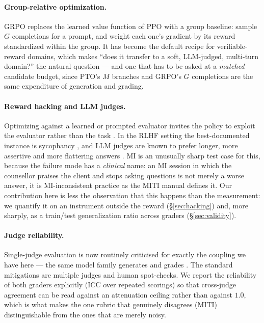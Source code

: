 \paragraph{Group-relative optimization.}
GRPO \citep{shao2024deepseekmath} replaces the learned value function of PPO
\citep{schulman2017ppo} with a group baseline: sample $G$ completions for a prompt, and
weight each one's gradient by its reward standardized within the group. It has become the
default recipe for verifiable-reward domains, which makes ``does it transfer to a soft,
LLM-judged, multi-turn domain?'' the natural question --- and one that has to be asked at a
\emph{matched} candidate budget, since PTO's $M$ branches and GRPO's $G$ completions are
the same expenditure of generation and grading.

\paragraph{Reward hacking and LLM judges.}
Optimizing against a learned or prompted evaluator invites the policy to exploit the
evaluator rather than the task \citep{gao2023scaling, skalse2022defining}. In the RLHF
setting the best-documented instance is sycophancy \citep{sharma2024sycophancy,
perez2023discovering}, and LLM judges are known to prefer longer, more assertive and
more flattering answers \citep{zheng2023judging, dubois2024lengthcontrolled}. MI is an
unusually sharp test case for this, because the failure mode has a \emph{clinical} name:
an MI session in which the counsellor praises the client and stops asking questions is not
merely a worse answer, it is MI-inconsistent practice as the MITI manual
\citep{moyers2016miti} defines it. Our contribution here is less the observation that this
happens than the measurement: we quantify it on an instrument outside the reward
(\S\ref{sec:hacking}) and, more sharply, as a train/test generalization ratio across
graders (\S\ref{sec:validity}).

\paragraph{Judge reliability.}
Single-judge evaluation is now routinely criticised for exactly the coupling we have here
--- the same model family generates and grades \citep{panickssery2024selfpreference}. The
standard mitigations are multiple judges and human spot-checks. We report the reliability
of both graders explicitly (ICC over repeated scorings) so that cross-judge agreement can
be read against an attenuation ceiling rather than against $1.0$, which is what makes the
one rubric that genuinely disagrees (MITI) distinguishable from the ones that are merely
noisy.
